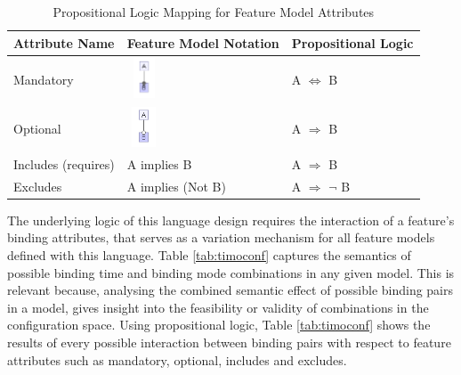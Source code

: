 \documentclass[conference]{IEEEtran}
\begin{document}
\begin{table}[H]
\caption{Propositional Logic Mapping for Feature Model Attributes}
\begin{center}
\begin{tabular}{P{2cm} P{2cm} P{2cm}}
\hline
    Attribute Name & Feature Model Notation & Propositional Logic  \\ \hline
    Mandatory & 
\vspace{0.3px}    
\includegraphics[width=10mm, height=12mm]{diagrams/mandatory.png} & A $ \Leftrightarrow $ B \\ \hline
    Optional &\vspace{0.3px} \includegraphics[width=10mm, height=12mm]{diagrams/optional.png}  & A $ \Rightarrow $ B \\ \hline
    Includes (requires) & A implies B &  A $ \Rightarrow $ B \\ \hline
    Excludes & A implies (Not B) &  A $ \Rightarrow $ $ \neg $ B \\ \hline
\end{tabular}
\label{tab:propmap}
\end{center}
\end{table}

The underlying logic of this language design requires the interaction of a feature's binding attributes, that serves as a variation mechanism for all feature models defined with this language. Table \ref{tab:timoconf} captures the semantics of possible binding time and binding mode combinations in any given model. This is relevant because, analysing the combined semantic effect of possible binding pairs in a model, gives insight into the feasibility or validity of combinations in the configuration space. Using propositional logic, Table \ref{tab:timoconf} shows the results of every possible interaction between binding pairs with respect to feature attributes such as mandatory, optional, includes and excludes. 
\end{document}
